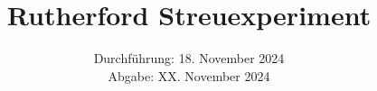 

\subject{\texorpdfstring{\vspace{2ex}}{}V16\texorpdfstring{\vspace{-2ex}}{}} %
\title{Rutherford Streuexperiment} %
\date{
	Durchführung: 18. November 2024 %
	\\ Abgabe: XX. November 2024 %
}





\maketitle
\thispagestyle{empty}

\tableofcontents
\newpage








\printbibliography{}

\newpage



